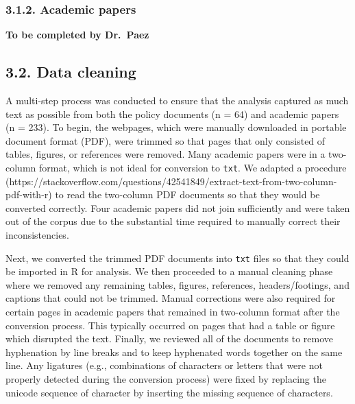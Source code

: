 \documentclass[]{elsarticle} %
\begin{document}
\begin{table}

\caption{\label{tab:policy-documents}\label{tab:search-results}Search results from the main STP stakeholder groups.}
\centering
{}
\end{table}

\hypertarget{academic-papers}{%
\subsubsection{3.1.2. Academic papers}\label{academic-papers}}

\textbf{To be completed by Dr.~Paez}

\hypertarget{data-cleaning}{%
\subsection{3.2. Data cleaning}\label{data-cleaning}}

A multi-step process was conducted to ensure that the analysis captured
as much text as possible from both the policy documents (n = 64) and
academic papers (n = 233). To begin, the webpages, which were manually
downloaded in portable document format (PDF), were trimmed so that pages
that only consisted of tables, figures, or references were removed. Many
academic papers were in a two-column format, which is not ideal for
conversion to \texttt{txt}. We adapted a procedure
(https://stackoverflow.com/questions/42541849/extract-text-from-two-column-pdf-with-r)
to read the two-column PDF documents so that they would be converted
correctly. Four academic papers did not join sufficiently and were taken
out of the corpus due to the substantial time required to manually
correct their inconsistencies.

Next, we converted the trimmed PDF documents into \texttt{txt} files so
that they could be imported in R for analysis. We then proceeded to a
manual cleaning phase where we removed any remaining tables, figures,
references, headers/footings, and captions that could not be trimmed.
Manual corrections were also required for certain pages in academic
papers that remained in two-column format after the conversion process.
This typically occurred on pages that had a table or figure which
disrupted the text. Finally, we reviewed all of the documents to remove
hyphenation by line breaks and to keep hyphenated words together on the
same line. Any ligatures (e.g., combinations of characters or letters
that were not properly detected during the conversion process) were
fixed by replacing the unicode sequence of character by inserting the
missing sequence of characters.
\end{document}
